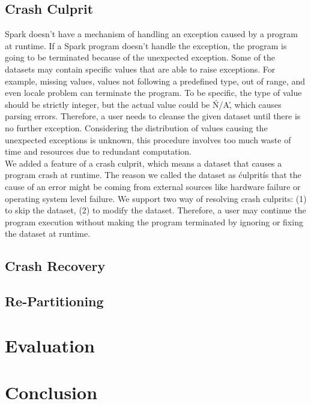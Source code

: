 \documentclass{acm_proc_article-sp}
\begin{document}
\subsection{Crash Culprit}

Spark doesn't have a mechanism of handling an exception caused by a program at runtime. If a Spark program doesn't handle the exception, the program is going to be terminated because of the unexpected exception. Some of the datasets may contain specific values that are able to raise exceptions. For example, missing values, values not following a predefined type, out of range, and even locale problem can terminate the program. To be specific, the type of value should be strictly integer, but the actual value could be \'N/A\', which causes parsing errors. Therefore, a user needs to cleanse the given dataset until there is no further exception. Considering the distribution of values causing the unexpected exceptions is unknown, this procedure involves too much waste of time and resources due to redundant computation.\\

We added a feature of a crash culprit, which means a dataset that causes a program crash at runtime. The reason we called the dataset as \'culprit\' is that the cause of an error might be coming from external sources like hardware failure or operating system level failure. We support two way of resolving crash culprits: (1) to skip the dataset, (2) to modify the dataset. Therefore, a user may continue the program execution without making the program terminated by ignoring or fixing the dataset at runtime.

\subsection{Crash Recovery}

\subsection{Re-Partitioning}

\section{Evaluation}
\section{Conclusion}


  
\balancecolumns
\end{document}
